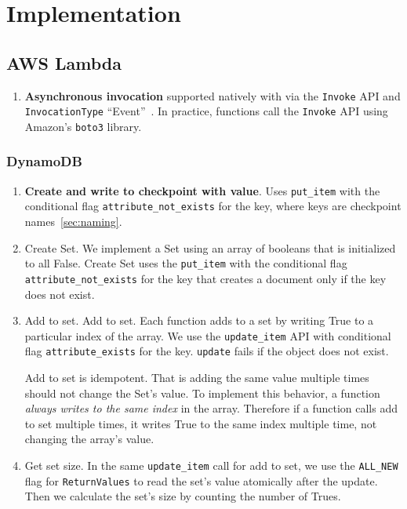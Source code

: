 \section{Implementation}\label{sec:impl}

\subsection{AWS Lambda}

\begin{enumerate}
  \item \textbf{Asynchronous invocation} supported natively with via the \texttt{Invoke} API and \texttt{InvocationType} ``Event''~\cite{aws-asyn-invoke}. In practice, functions call the \texttt{Invoke} API using Amazon's \texttt{boto3} library.
\end{enumerate}

\subsubsection{DynamoDB}

\begin{enumerate}
  \item \textbf{Create and write to checkpoint with value}. Uses \texttt{put\_item} with the conditional flag \texttt{attribute\_not\_exists} for the key, where keys are checkpoint names~\ref{sec:naming}. 
  \item Create Set. We implement a Set using an array of booleans that is initialized to all False. Create Set uses the \texttt{put\_item} with the conditional flag \texttt{attribute\_not\_exists} for the key that creates a document only if the key does not exist.
  \item Add to set. Add to set. Each function adds to a set by writing True to a particular index of the array. We use the \texttt{update\_item} API with conditional flag \texttt{attribute\_exists} for the key. \texttt{update} fails if the object does not exist.

  Add to set is idempotent. That is adding the same value multiple times should not change the Set's value. To implement this behavior, a function \emph{always writes to the same index} in the array. Therefore if a function calls add to set multiple times, it writes True to the same index multiple time, not changing the array's value.
  \item Get set size. In the same \texttt{update\_item} call for add to set, we use the \texttt{ALL\_NEW} flag for \texttt{ReturnValues} to read the set's value atomically after the update. Then we calculate the set's size by counting the number of Trues.
\end{enumerate}

